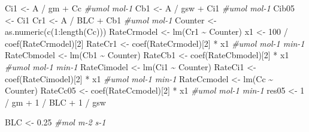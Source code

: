 \documentclass[
]{krantz}
\makeatletter
\newenvironment{Shaded}{\begin{snugshade}}{\end{snugshade}}
\newcommand{\CommentTok}[1]{\textcolor[rgb]{0.56,0.35,0.01}{\textit{#1}}}
\newcommand{\DecValTok}[1]{\textcolor[rgb]{0.00,0.00,0.81}{#1}}
\newcommand{\FloatTok}[1]{\textcolor[rgb]{0.00,0.00,0.81}{#1}}
\newcommand{\FunctionTok}[1]{\textcolor[rgb]{0.00,0.00,0.00}{#1}}
\newcommand{\NormalTok}[1]{#1}
\newcommand{\OtherTok}[1]{\textcolor[rgb]{0.56,0.35,0.01}{#1}}
\newcommand{\SpecialCharTok}[1]{\textcolor[rgb]{0.00,0.00,0.00}{#1}}
\newenvironment{kframe}{%
\medskip{}
\setlength{\fboxsep}{.8em}
 \def\at@end@of@kframe{}%
 \ifinner\ifhmode%
  \def\at@end@of@kframe{\end{minipage}}%
  \begin{minipage}{\columnwidth}%
 \fi\fi%
 \def\FrameCommand##1{\hskip\@totalleftmargin \hskip-\fboxsep
 \colorbox{shadecolor}{##1}\hskip-\fboxsep
     \hskip-\linewidth \hskip-\@totalleftmargin \hskip\columnwidth}%
 \MakeFramed {\advance\hsize-\width
   \@totalleftmargin\z@ \linewidth\hsize
   \@setminipage}}%
 {\par\unskip\endMakeFramed%
 \at@end@of@kframe}
\renewenvironment{Shaded}{\begin{kframe}}{\end{kframe}}
\makeatother
\begin{document}
\begin{Shaded}
\begin{Highlighting}[]
\NormalTok{Ci1 }\OtherTok{\textless{}{-}}\NormalTok{ A }\SpecialCharTok{/}\NormalTok{ gm }\SpecialCharTok{+}\NormalTok{ Cc }\CommentTok{\#umol mol{-}1}
\NormalTok{Cb1 }\OtherTok{\textless{}{-}}\NormalTok{ A }\SpecialCharTok{/}\NormalTok{ gsw }\SpecialCharTok{+}\NormalTok{ Ci1 }\CommentTok{\#umol mol{-}1}
\NormalTok{Cib05 }\OtherTok{\textless{}{-}}\NormalTok{ Ci1}
\NormalTok{Cr1 }\OtherTok{\textless{}{-}}\NormalTok{ A }\SpecialCharTok{/}\NormalTok{ BLC }\SpecialCharTok{+}\NormalTok{ Cb1 }\CommentTok{\#umol mol{-}1}
\NormalTok{Counter }\OtherTok{\textless{}{-}} \FunctionTok{as.numeric}\NormalTok{(}\FunctionTok{c}\NormalTok{(}\DecValTok{1}\SpecialCharTok{:}\FunctionTok{length}\NormalTok{(Cc)))}
\NormalTok{RateCrmodel }\OtherTok{\textless{}{-}} \FunctionTok{lm}\NormalTok{(Cr1 }\SpecialCharTok{\textasciitilde{}}\NormalTok{ Counter)}
\NormalTok{x1 }\OtherTok{\textless{}{-}} \DecValTok{100} \SpecialCharTok{/} \FunctionTok{coef}\NormalTok{(RateCrmodel)[}\DecValTok{2}\NormalTok{]}
\NormalTok{RateCr1 }\OtherTok{\textless{}{-}} \FunctionTok{coef}\NormalTok{(RateCrmodel)[}\DecValTok{2}\NormalTok{] }\SpecialCharTok{*}\NormalTok{ x1 }\CommentTok{\#umol mol{-}1 min{-}1}
\NormalTok{RateCbmodel }\OtherTok{\textless{}{-}} \FunctionTok{lm}\NormalTok{(Cb1 }\SpecialCharTok{\textasciitilde{}}\NormalTok{ Counter)}
\NormalTok{RateCb1 }\OtherTok{\textless{}{-}} \FunctionTok{coef}\NormalTok{(RateCbmodel)[}\DecValTok{2}\NormalTok{] }\SpecialCharTok{*}\NormalTok{ x1 }\CommentTok{\#umol mol{-}1 min{-}1}
\NormalTok{RateCimodel }\OtherTok{\textless{}{-}} \FunctionTok{lm}\NormalTok{(Ci1 }\SpecialCharTok{\textasciitilde{}}\NormalTok{ Counter)}
\NormalTok{RateCi1 }\OtherTok{\textless{}{-}} \FunctionTok{coef}\NormalTok{(RateCimodel)[}\DecValTok{2}\NormalTok{] }\SpecialCharTok{*}\NormalTok{ x1 }\CommentTok{\#umol mol{-}1 min{-}1}
\NormalTok{RateCcmodel }\OtherTok{\textless{}{-}} \FunctionTok{lm}\NormalTok{(Cc }\SpecialCharTok{\textasciitilde{}}\NormalTok{ Counter)}
\NormalTok{RateCc05 }\OtherTok{\textless{}{-}} \FunctionTok{coef}\NormalTok{(RateCcmodel)[}\DecValTok{2}\NormalTok{] }\SpecialCharTok{*}\NormalTok{ x1 }\CommentTok{\#umol mol{-}1 min{-}1}
\NormalTok{res05 }\OtherTok{\textless{}{-}} \DecValTok{1} \SpecialCharTok{/}\NormalTok{ gm }\SpecialCharTok{+} \DecValTok{1} \SpecialCharTok{/}\NormalTok{ BLC }\SpecialCharTok{+} \DecValTok{1} \SpecialCharTok{/}\NormalTok{ gsw}

\NormalTok{BLC }\OtherTok{\textless{}{-}} \FloatTok{0.25} \CommentTok{\#mol m{-}2 s{-}1}


\end{Highlighting}
\end{Shaded}
\end{document}
